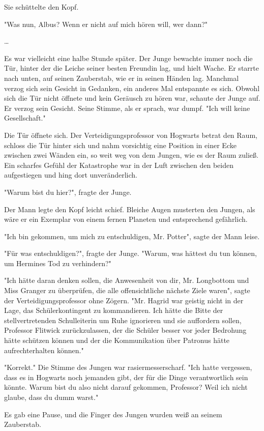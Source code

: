 {Sie schüttelte den Kopf.

"Was nun, Albus? Wenn er nicht auf mich hören will, wer dann?"

…

Es war vielleicht eine halbe Stunde später. Der Junge bewachte immer noch die Tür, hinter der die Leiche seiner besten Freundin lag, und hielt Wache. Er starrte nach unten, auf seinen Zauberstab, wie er in seinen Händen lag. Manchmal verzog sich sein Gesicht in Gedanken, ein anderes Mal entspannte es sich. Obwohl sich die Tür nicht öffnete und kein Geräusch zu hören war, schaute der Junge auf. Er verzog sein Gesicht. Seine Stimme, als er sprach, war dumpf. "Ich will keine Gesellschaft."

Die Tür öffnete sich. Der Verteidigungsprofessor von Hogwarts betrat den Raum, schloss die Tür hinter sich und nahm vorsichtig eine Position in einer Ecke zwischen zwei Wänden ein, so weit weg von dem Jungen, wie es der Raum zuließ. Ein scharfes Gefühl der Katastrophe war in der Luft zwischen den beiden aufgestiegen und hing dort unveränderlich.

"Warum bist du hier?", fragte der Junge.

Der Mann legte den Kopf leicht schief. Bleiche Augen musterten den Jungen, als wäre er ein Exemplar von einem fernen Planeten und entsprechend gefährlich.

"Ich bin gekommen, um mich zu entschuldigen, Mr. Potter", sagte der Mann leise.

"Für was entschuldigen?", fragte der Junge. "Warum, was hättest du tun können, um Hermines Tod zu verhindern?"

"Ich hätte daran denken sollen, die Anwesenheit von dir, Mr. Longbottom und Miss Granger zu überprüfen, die alle offensichtliche nächste Ziele waren", sagte der Verteidigungsprofessor ohne Zögern. "Mr. Hagrid war geistig nicht in der Lage, das Schülerkontingent zu kommandieren. Ich hätte die Bitte der stellvertretenden Schulleiterin um Ruhe ignorieren und sie auffordern sollen, Professor Flitwick zurückzulassen, der die Schüler besser vor jeder Bedrohung hätte schützen können und der die Kommunikation über Patronus hätte aufrechterhalten können."

"Korrekt." Die Stimme des Jungen war rasiermesserscharf. "Ich hatte vergessen, dass es in Hogwarts noch jemanden gibt, der für die Dinge verantwortlich sein könnte. Warum bist du also nicht darauf gekommen, Professor? Weil ich nicht glaube, dass du dumm warst."

Es gab eine Pause, und die Finger des Jungen wurden weiß an seinem Zauberstab.

}
